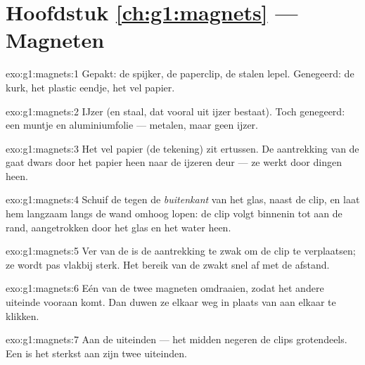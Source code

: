 \section*{Hoofdstuk \ref{ch:g1:magnets} --- Magneten}

\begin{solution}{exo:g1:magnets:1}
Gepakt: de spijker, de paperclip, de stalen lepel. Genegeerd: de
kurk, het plastic eendje, het vel papier.
\end{solution}

\begin{solution}{exo:g1:magnets:2}
IJzer (en staal, dat vooral uit ijzer bestaat). Toch genegeerd: een
muntje en aluminiumfolie --- metalen, maar geen ijzer.
\end{solution}

\begin{solution}{exo:g1:magnets:3}
Het vel papier (de tekening) zit ertussen. De aantrekking van de
 gaat dwars door het papier heen naar de ijzeren deur --- ze
werkt door dingen heen.
\end{solution}

\begin{solution}{exo:g1:magnets:4}
Schuif de  tegen de \emph{buitenkant} van het glas, naast de
clip, en laat hem langzaam langs de wand omhoog lopen: de clip volgt
binnenin tot aan de rand, aangetrokken door het glas en het water
heen.
\end{solution}

\begin{solution}{exo:g1:magnets:5}
Ver van de  is de aantrekking te zwak om de clip te
verplaatsen; ze wordt pas vlakbij sterk. Het bereik van de
 zwakt snel af met de afstand.
\end{solution}

\begin{solution}{exo:g1:magnets:6}
Eén van de twee magneten omdraaien, zodat het andere uiteinde vooraan
komt. Dan duwen ze elkaar weg in plaats van aan elkaar te klikken.
\end{solution}

\begin{solution}{exo:g1:magnets:7}
Aan de uiteinden --- het midden negeren de clips grotendeels. Een
 is het sterkst aan zijn twee uiteinden.
\end{solution}

